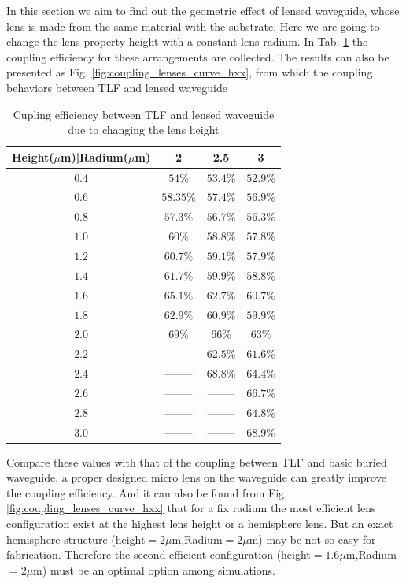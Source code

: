 
In this section we aim to find out the geometric effect of lensed waveguide, whose lens is made from the same material with the substrate. Here we are going to change the lens property height with a constant lens radium. In Tab. \ref{tab:coupling_lensed_waveguide_height} the coupling efficiency for these arrangements are collected. The results can also be presented as Fig. \ref{fig:coupling_lenses_curve_hxx}, from which the coupling behaviors between TLF and lensed waveguide    
\begin{table}
\caption{Cupling efficiency between TLF and lensed waveguide due to changing the lens height}
\centering
\begin{tabular}{|c|c|c|c|}
\hline
Height($\mu$m)|Radium($\mu$m)&	2&	2.5&	3\\
\hline
$0.4$&$54\%$&$53.4\%$&$52.9\%$\\
$0.6$&$58.35\%$&$57.4\%$&$56.9\%$\\
$0.8$&$57.3\%$&$56.7\%$&$56.3\%$\\
$1.0$&$60\%$&$58.8\%$&$57.8\%$\\
$1.2$&$60.7\%$&$59.1\%$&$57.9\%$\\
$1.4$&$61.7\%$&$59.9\%$&$58.8\%$\\
$1.6$&$65.1\%$&$62.7\%$&$60.7\%$\\
$1.8$&$62.9\%$&$60.9\%$&$59.9\%$\\
$2.0$&$69\%$  &  $66\%$&$63\%$\\
$2.2$&--------&$62.5\%$&$61.6\%$\\
$2.4$&--------&$68.8\%$&$64.4\%$\\
$2.6$&--------&--------&$66.7\%$\\
$2.8$&--------&--------&$64.8\%$\\
$3.0$&--------&--------&$68.9\%$\\
\hline

\end{tabular}
\label{tab:coupling_lensed_waveguide_height}
\end{table}
Compare these values with that of the coupling between TLF and basic buried waveguide, a proper designed micro lens on the waveguide can greatly improve the coupling efficiency. And it can also be found from Fig. \ref{fig:coupling_lenses_curve_hxx} that for a fix radium the most efficient lens configuration exist at the highest lens height or a hemisphere lens. But an exact hemisphere structure (height$=2\mu$m,Radium$=2\mu$m) may be not so easy for fabrication. Therefore the second efficient configuration (height$=1.6\mu$m,Radium$=2\mu$m) must be  an optimal option among simulations. 
